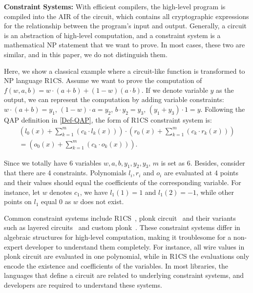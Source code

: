 \documentclass[letterpaper,twocolumn,10pt]{article}
\theoremstyle{definition}
\newcommand{\mypara}[1]{\noindent\textbf{{#1: }}}
\newcommand{\new}[1]{{#1}\xspace}
\begin{document}
\mypara{Constraint Systems} With efficient compilers, the high-level program is compiled into the AIR of the circuit, which contains all cryptographic expressions for the relationship between the program's input and output. Generally, a circuit is an abstraction of high-level computation, and a constraint system is a mathematical NP statement that we want to prove. In most cases, these two are similar, and in this paper, we do not distinguish them. \new{Here, we show a classical example where a circuit-like function is transformed to NP language R1CS. Assume we want to prove the computation of $f(w,a,b)=w\cdot(a+b)+(1-w)(a\cdot b)$. If we denote variable $y$ as the output, we can represent the computation by adding variable constraints: $w\cdot(a+b)=y_{1}$, $(1-w)\cdot a=y_{2}$, $b\cdot y_{2}=y_{3}$, $(y_{1}+y_{3})\cdot 1=y$. Following the QAP definition in \autoref{Def-QAP}, the form of R1CS constraint system is: 
	\begin{equation}
		\begin{aligned}
			(l_{0}(x)+\sum_{k=1}^{m}(c_{k}\cdot l_{k}(x)))\cdot(r_{0}(x)+\sum_{k=1}^{m}(c_{k}\cdot r_{k}(x))) \\        
			=(o_{0}(x)+\sum_{k=1}^m(c_{k}\cdot o_{k}(x))).
		\end{aligned}    
	\end{equation}
	
	\noindent Since we totally have 6 variables $w,a,b,y_{1},y_{2},y_{3}$, $m$ is set as 6. Besides, consider that there are 4 constraints. Polynomials $l_{i}, r_{i}$ and $o_{i}$ are evaluated at 4 points and their values should equal the coefficients of the corresponding variable. For instance, let $w$ denotes $c_{1}$, we have $l_{1}(1)=1$ and $l_{1}(2)=-1$, while other points on $l_{1}$ equal $0$ as $w$ does not exist.
}

Common constraint systems include R1CS~\cite{gennaro2013quadratic}, plonk circuit~\cite{gabizon2019plonk} and their variants  such as layered circuits~\cite{xie2019libra,ben2019scalable} and custom plonk~\cite{chen2023hyperplonk}. These constraint systems differ in algebraic structures for high-level computation, making it troublesome for a non-expert developer to understand them completely. \new{For instance, all wire values in plonk circuit are evaluated in one polynomial, while in R1CS the evaluations only encode the existence and coefficients of the variables.}
In most libraries, the languages that define a circuit are related to underlying constraint systems, and developers are required to understand these systems.
\end{document}
